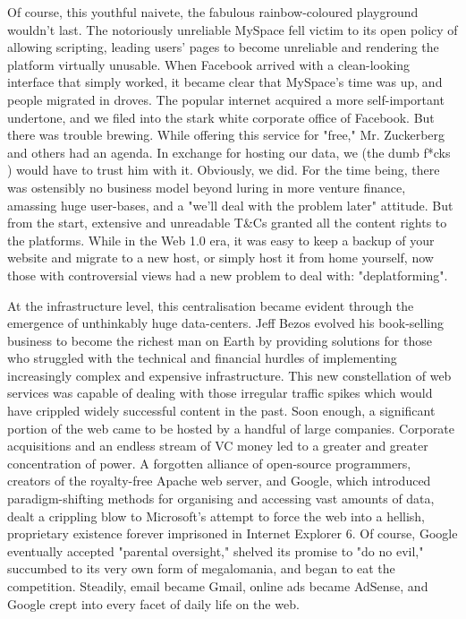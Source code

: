 Of course, this youthful naivete, the fabulous rainbow-coloured playground wouldn't last. The notoriously unreliable MySpace fell victim to its open policy of allowing scripting, leading users' pages to become unreliable and rendering the platform virtually unusable. When Facebook arrived with a clean-looking interface that simply worked, it became clear that MySpace's time was up, and people migrated in droves. The popular internet acquired a more self-important undertone, and we filed into the stark white corporate office of Facebook. But there was trouble brewing. While offering this service for "free," Mr. Zuckerberg and others had an agenda. In exchange for hosting our data, we (the dumb f*cks \cite{carlson2010ims}) would have to trust him with it. Obviously, we did. For the time being, there was ostensibly no business model beyond luring in more venture finance, amassing huge user-bases, and a "we'll deal with the problem later" attitude. But from the start, extensive and unreadable T\&Cs granted all the content rights to the platforms. While in the Web 1.0 era, it was easy to keep a backup of your website and migrate to a new host, or simply host it from home yourself, now those with controversial views had a new problem to deal with: "deplatforming".

At the infrastructure level, this centralisation became evident through the emergence of unthinkably huge data-centers. Jeff Bezos evolved his book-selling business to become the richest man on Earth by providing solutions for those who struggled with the technical and financial hurdles of implementing increasingly complex and expensive infrastructure. This new constellation of web services was capable of dealing with those irregular traffic spikes which would have crippled widely successful content in the past. Soon enough, a significant portion of the web came to be hosted by a handful of large companies. Corporate acquisitions and an endless stream of VC money led to a greater and greater concentration of power. A forgotten alliance of open-source programmers, creators of the royalty-free Apache web server, and Google, which introduced paradigm-shifting methods for organising and accessing vast amounts of data, dealt a crippling blow to Microsoft's attempt to force the web into a hellish, proprietary existence forever imprisoned in Internet Explorer 6. Of course, Google eventually accepted "parental oversight," shelved its promise to "do no evil," succumbed to its very own form of megalomania, and began to eat the competition. Steadily, email became Gmail, online ads became AdSense, and Google crept into every facet of daily life on the web.

